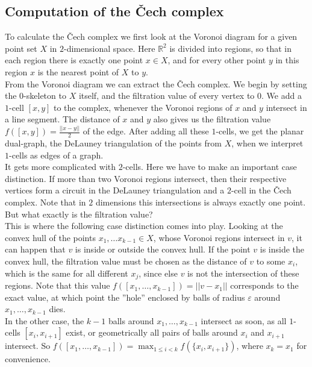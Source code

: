 \documentclass[11pt, a4paper, UKenglish]{article}
\newcommand{\bR}{\mathbb{R}}
\begin{document}
    \subsection{Computation of the Čech complex}\label{subsec:čech-complex}

    To calculate the Čech complex we first look at the Voronoi diagram for a given point set $X$ in $2$-dimensional space.
    Here $\bR^2$ is divided into regions, so that in each region there is exactly one point $x\in X$, and for every other point $y$ in this region $x$ is the nearest point of $X$ to $y$.\\
    From the Voronoi diagram we can extract the Čech complex.
    We begin by setting the $0$-skeleton to $X$ itself, and the filtration value of every vertex to $0$.
    We add a $1$-cell $[x,y]$ to the complex, whenever the Voronoi regions of $x$ and $y$ intersect in a line segment.
    The distance of $x$ and $y$ also gives us the filtration value $f([x,y]) = \frac{||x-y||}{2}$ of the edge.
    After adding all these $1$-cells, we get the planar dual-graph, the DeLauney triangulation of the points from $X$, when we interpret $1$-cells as edges of a graph.\\
    It gets more complicated with $2$-cells.
    Here we have to make an important case distinction.
    If more than two Voronoi regions intersect, then their respective vertices form a circuit in the DeLauney triangulation and a $2$-cell in the Čech complex.
    Note that in $2$ dimensions this intersections is always exactly one point.
    But what exactly is the filtration value?\\
    This is where the following case distinction comes into play.
    Looking at the convex hull of the points $x_1,\ldots x_{k-1}\in X$, whose Voronoi regions intersect in $v$, it can happen that $v$ is inside or outside the convex hull.
    If the point $v$ is inside the convex hull, the filtration value must be chosen as the distance of $v$ to some $x_i$, which is the same for all different $x_j$, since else $v$ is not the intersection of these regions.
    Note that this value $f([x_1,\ldots,x_{k-1}])=||v-x_1||$ corresponds to the exact value, at which point the ''hole'' enclosed by balls of radius $\varepsilon$ around $x_1,\ldots,x_{k-1}$ dies.\\
    
    In the other case, the $k-1$ balls around $x_1,\ldots,x_{k-1}$ intersect as soon, as all $1$-cells $[x_i,x_{i+1}]$ exist, or geometrically all pairs of balls around $x_i$ and $x_{i+1}$ intersect.
    So $f([x_1,\ldots,x_{k-1}])=\max_{1\leq i<k} f(\{x_i,x_{i+1}\})$, where $x_k=x_1$ for convenience.
\end{document}
